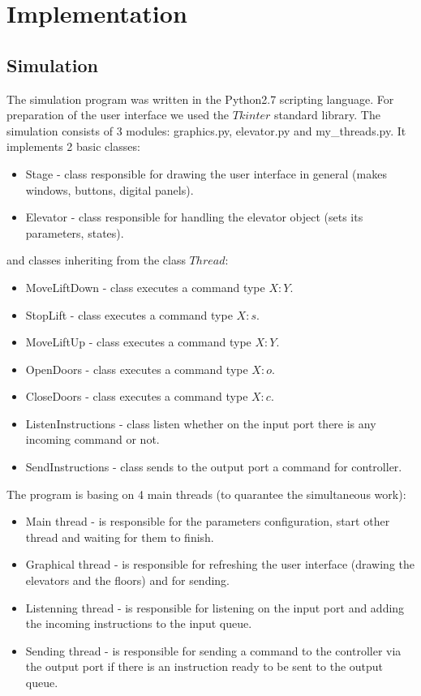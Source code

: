 \documentclass[12pt]{article}
\begin{document}


\section{Implementation}
\subsection{Simulation}
The simulation program was written in the Python2.7 scripting language. For preparation of the user interface we used the $Tkinter$ standard library. 
The simulation consists of 3 modules: graphics.py, elevator.py and my{\_}threads.py. It implements 2 basic classes:  
\begin{itemize}
 \item Stage - class responsible for drawing the user interface in general (makes windows, buttons, digital panels).
 \item Elevator - class responsible for handling the elevator object (sets its parameters, states). 
\end{itemize}
and classes inheriting from the class $Thread$:
\begin{itemize}
 \item MoveLiftDown - class executes a command type $X:Y$.
 \item StopLift - class executes a command type $X:s$.
 \item MoveLiftUp - class executes a command type $X:Y$.
 \item OpenDoors - class executes a command type $X:o$.
 \item CloseDoors - class executes a command type $X:c$.
 \item ListenInstructions - class listen whether on the input port there is any incoming command or not.
 \item SendInstructions - class sends to the output port a command for controller.
\end{itemize}


The program is basing on 4 main threads (to quarantee the simultaneous work): 
\begin{itemize}
	\item Main thread - is responsible for the parameters configuration, start other thread and waiting for them to finish.
	\item Graphical thread - is responsible for refreshing the user interface (drawing the elevators and the floors) and for sending. 
	\item Listenning thread - is responsible for listening on the input port and adding the incoming instructions to the input queue.
	\item Sending thread - is responsible for sending a command to the controller via the output port if there is an instruction ready to be sent to the output queue.		
\end{itemize}
\end{document}
